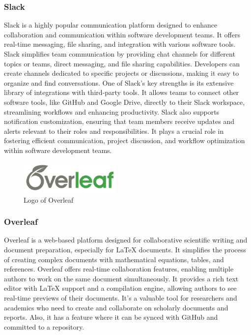 \documentclass[conference]{IEEEtran}
\begin{document}
        \subsubsection{Slack}
        Slack is a highly popular communication platform designed to enhance collaboration and communication within software development teams. It offers real-time messaging, file sharing, and integration with various software tools. Slack simplifies team communication by providing chat channels for different topics or teams, direct messaging, and file sharing capabilities. Developers can create channels dedicated to specific projects or discussions, making it easy to organize and find conversations. One of Slack's key strengths is its extensive library of integrations with third-party tools. It allows teams to connect other software tools, like GitHub and Google Drive, directly to their Slack workspace, streamlining workflows and enhancing productivity. Slack also supports notification customization, ensuring that team members receive updates and alerts relevant to their roles and responsibilities. It plays a crucial role in fostering efficient communication, project discussion, and workflow optimization within software development teams.\\

        \begin{figure}[htbp]
        \centerline{\includegraphics[width=5cm]{Images/logo/overleaf.png}}
        \label{fig}
        \caption{Logo of Overleaf}
        \end{figure}
        \subsubsection{Overleaf}
        Overleaf is a web-based platform designed for collaborative scientific writing and document preparation, especially for LaTeX documents. It simplifies the process of creating complex documents with mathematical equations, tables, and references. Overleaf offers real-time collaboration features, enabling multiple authors to work on the same document simultaneously. It provides a rich text editor with LaTeX support and a compilation engine, allowing authors to see real-time previews of their documents. It's a valuable tool for researchers and academics who need to create and collaborate on scholarly documents and reports. Also, it has a feature where it can be synced with GitHub and committed to a repository.\\
\end{document}
